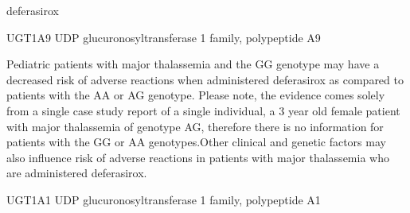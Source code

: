 \documentclass{resume} %
\begin{document}
\begin{rSection}{ deferasirox }
\begin{rSubsection}{ UGT1A9 }{ UDP glucuronosyltransferase 1 family, polypeptide A9 }{}{}
\item[] Pediatric patients with major thalassemia and the GG genotype may have a decreased risk of adverse reactions when administered deferasirox as compared to patients with the AA or AG genotype. Please note, the evidence comes solely from a single case study report of a single individual, a 3 year old female patient with major thalassemia of genotype AG, therefore there is no information for patients with the GG or AA genotypes.Other clinical and genetic factors may also influence risk of adverse reactions in patients with major thalassemia who are administered deferasirox.
\end{rSubsection}\begin{rSubsection}{ UGT1A1 }{ UDP glucuronosyltransferase 1 family, polypeptide A1 }{}{}
\item[]


\end{rSubsection}
\end{rSection}
\end{document}
